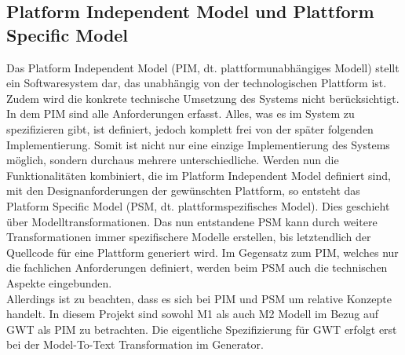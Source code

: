 \subsection*{Platform Independent Model und Plattform Specific Model} \label{PIMPSM}
Das Platform Independent Model (PIM, dt. plattformunabhängiges Modell) stellt ein
Softwaresystem dar, das unabhängig von der technologischen Plattform ist. Zudem wird die konkrete technische Umsetzung des Systems nicht berücksichtigt. In dem PIM
sind alle Anforderungen erfasst. Alles, was es im System zu spezifizieren gibt, ist definiert,
jedoch komplett frei von der später folgenden Implementierung. Somit ist nicht nur eine
einzige Implementierung des Systems möglich, sondern durchaus mehrere
unterschiedliche.
Werden nun die Funktionalitäten kombiniert, die im Platform Independent Model definiert sind, mit den Designanforderungen der gewünschten Plattform, so entsteht das Platform Specific Model (PSM, dt. plattformspezifisches Model). Dies geschieht über Modelltransformationen. Das nun entstandene PSM kann durch weitere Transformationen immer spezifischere Modelle erstellen, bis letztendlich der Quellcode für eine Plattform generiert wird. Im Gegensatz zum PIM, welches nur die
fachlichen Anforderungen definiert, werden beim PSM auch die technischen Aspekte
eingebunden.\cite[S.377 ff.]{bib:MDA2}\cite{bib:MDA3}\\ 
 
Allerdings ist zu beachten, dass es sich bei PIM und PSM um relative Konzepte handelt. 
In diesem Projekt sind sowohl M1 als auch M2 Modell im Bezug auf GWT als PIM zu betrachten. Die eigentliche Spezifizierung für GWT erfolgt erst bei der Model-To-Text Transformation im Generator.